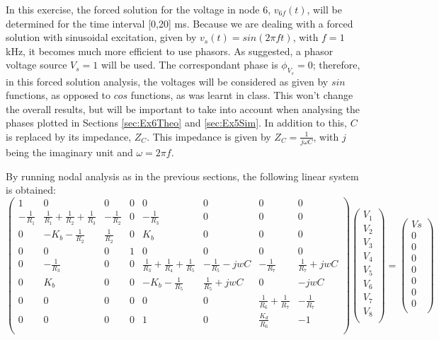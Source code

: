 In this exercise, the forced solution for the voltage in node 6, $v_{6f}(t)$, will be determined for the time interval [0,20] ms. Because we are dealing with a forced solution with sinusoidal excitation, given by $v_s(t)=sin(2\pi ft)$, with $f=1$kHz, it becomes much more efficient to use phasors. As suggested, a phasor voltage source $V_s=1$ will be used. The correspondant phase is $\phi_{V_s}=0$; therefore, in this forced solution analysis, the voltages will be considered as given by $sin$ functions, as opposed to $cos$ functions, as was learnt in class. This won't change the overall results, but will be important to take into account when analysing the phases plotted in Sections \ref{sec:Ex6Theo} and \ref{sec:Ex5Sim}. In addition to this, $C$ is replaced by its impedance, $Z_C$. This impedance is given by $Z_C=\frac{1}{j\omega C}$, with $j$ being the imaginary unit and $\omega=2\pi f$.
\par
By running nodal analysis as in the previous sections, the following linear system is obtained:
\vspace{-2mm}
\begin{equation}
  \begin{pmatrix}
    1 & 0 & 0 & 0 & 0 & 0 & 0 & 0 \\
    -\frac{1}{R_1} & \frac{1}{R_1}+\frac{1}{R_2}+\frac{1}{R_3} & -\frac{1}{R_2} & 0 & -\frac{1}{R_3} & 0 & 0 & 0 \\
    0 & -K_b-\frac{1}{R_2} & \frac{1}{R_2} & 0 & K_b & 0 & 0 & 0 \\
    0 & 0 & 0 & 1 & 0 & 0 & 0 & 0 \\
    0 & -\frac{1}{R_3} & 0 & 0 & \frac{1}{R_3}+\frac{1}{R_4}+\frac{1}{R_5}  & -\frac{1}{R_5}-jwC & -\frac{1}{R_7} & \frac{1}{R_7}+jwC \\
    0 & K_b & 0 & 0 & -K_b-\frac{1}{R_5} & \frac{1}{R_5}+jwC & 0 & -jwC \\
    0 & 0 & 0 & 0 & 0 & 0 & \frac{1}{R_6}+\frac{1}{R_7} & -\frac{1}{R_7} \\
    0 & 0 & 0 & 0 & 1 & 0 & \frac{K_d}{R_6} & -1 \\
  \end{pmatrix}
  \begin{pmatrix}
    V_1  \\
    V_2  \\
    V_3  \\
    V_4  \\
    V_5  \\
    V_6  \\
    V_7  \\
    V_8  \\
  \end{pmatrix}
  =
  \begin{pmatrix}
    Vs  \\
    0   \\
    0   \\
    0   \\
    0   \\
    0  \\
    0   \\
    0   \\
  \end{pmatrix}
  \label{eq:Exercise4LinearSystem}
\end{equation}

